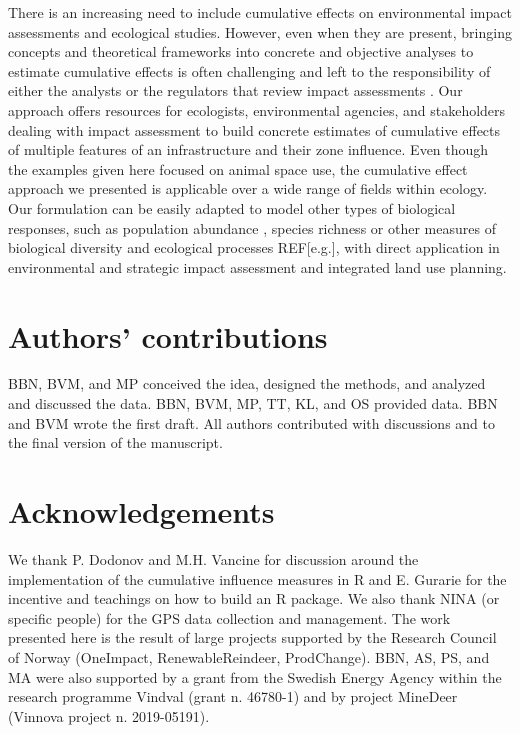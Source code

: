 \documentclass[titlepage]{article}
\begin{document}
There is an increasing need to include cumulative effects on environmental impact assessments and ecological studies. However, even when they are present, bringing concepts and theoretical frameworks into concrete and objective analyses to estimate cumulative effects is often challenging and left to the responsibility of either the analysts or the regulators that review impact assessments \citep{johnson_regulating_2011}. Our approach offers resources for ecologists, environmental agencies, and stakeholders dealing with impact assessment to build concrete estimates of cumulative effects of multiple features of an infrastructure and their zone influence. 
Even though the examples given here focused on animal space use, the cumulative effect approach we presented is applicable over a wide range
of fields within ecology. Our formulation can be easily adapted to model other types of biological responses, such as population abundance \citep[e.g.][]{benitez-lopez_impacts_2010},
species richness \citep[e.g.][]{ficetola_ecological_2009} or other measures of biological diversity and ecological processes REF[e.g.], with direct application in environmental and strategic impact assessment and integrated land use planning.
      
\section*{Authors’ contributions}

BBN, BVM, and MP conceived the idea, designed the methods, and analyzed and discussed the data. BBN, BVM, MP, TT, KL, and OS provided data. BBN and BVM wrote the first draft. All authors contributed with discussions and to the final version of the manuscript.

\section*{Acknowledgements}

We thank P. Dodonov and M.H. Vancine for discussion around the implementation of the cumulative influence measures in R and E. Gurarie for the incentive and teachings on how to build an R package. We also thank NINA (or specific people) for the GPS data collection and management. The work presented here is the result of large projects supported by the Research Council of Norway (OneImpact, RenewableReindeer, ProdChange). BBN, AS, PS, and MA were also supported by a grant from the Swedish Energy Agency within the research programme Vindval (grant n. 46780-1) and by project MineDeer (Vinnova project n. 2019-05191).
\end{document}
